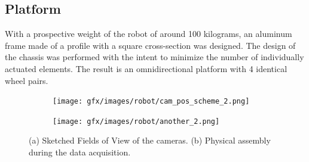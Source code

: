 \begin{description}
\section{Platform}
\label{sec:platform}
With a prospective weight of the robot of around 100 kilograms, an aluminum frame made of a profile with a square cross-section was designed.
The design of the chassis was performed with the intent to minimize the number of individually actuated elements. 
The result is an omnidirectional platform with 4 identical wheel pairs.

\begin{figure}[ht!] 
    \centering
    \begin{subfigure}[b]{0.43\textwidth}
        \centering
        \texttt{[image: gfx/images/robot/cam\_pos\_scheme\_2.png]}
        \caption{}
        \label{fig_camera_positioning}
    \end{subfigure}
    \begin{subfigure}[b]{0.43\textwidth}
        \centering
        \texttt{[image: gfx/images/robot/another\_2.png]}
        \caption{}
        \label{fig_robot_in_real_world}
    \end{subfigure}
    \caption{(a) Sketched Fields of View of the cameras. (b) Physical assembly during the data acquisition.}
    \label{fig:Robot}
\end{figure}




\end{description}
